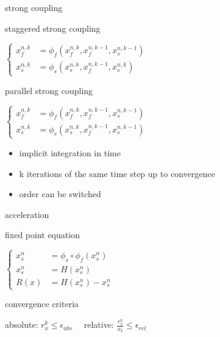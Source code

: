 \documentclass[10pt,t]{beamer}
\begin{document}
\begin{frame}{strong coupling}
  
  \begin{block}{staggered strong coupling}
  \begin{center}
  $
  \left\{
    \begin{aligned}
        x_f^{n,k}&=\phi_f\left(x_f^{n,k},x_f^{n,k-1},x_s^{n,k-1} \right) \\
        x_s^{n,k}&=\phi_s\left(x_s^{n,k},x_f^{n,k-1},x_s^{n,k} \right)
    \end{aligned}
    \right.
  $
      
  \end{center}
  \end{block}  

  
  \begin{block}{parallel strong coupling}
  \begin{center}
  $
  \left\{
    \begin{aligned}
        x_f^{n,k}&=\phi_f\left(x_f^{n,k},x_f^{n,k-1},x_s^{n,k-1} \right) \\
        x_s^{n,k}&=\phi_s\left(x_s^{n,k},x_f^{n,k-1},x_s^{n,k-1} \right)
    \end{aligned}
    \right.
  $
  \end{center}
  \end{block}  

\begin{itemize}
    \item implicit integration in time
    \item k iterations of the same time step up to convergence
    \item order can be switched
\end{itemize}


  \hyperlink{coupling}{}
\end{frame}



\begin{frame}{acceleration}

  \begin{block}{fixed point equation}
  \begin{center}
  $
  \left\{
    \begin{aligned}
        x_s^n&=\phi_s  \circ \phi_f \left(x_s^n \right) \\
        x_s^n&=H \left(x_s^n \right) \\
        R(x) &=H \left(x_s^n \right) - x_s^n 
    \end{aligned}
    \right.
  $
      
  \end{center}
  \end{block}  

  \begin{block}{convergence criteria}
  \begin{center}
  absolute: $r_x^k \leq \epsilon_{abs}  \quad$  relative: $\frac{r_x^k}{x_k} \leq \epsilon_{rel} $
      
  \end{center}
  \end{block}  



\end{frame}
\end{document}
